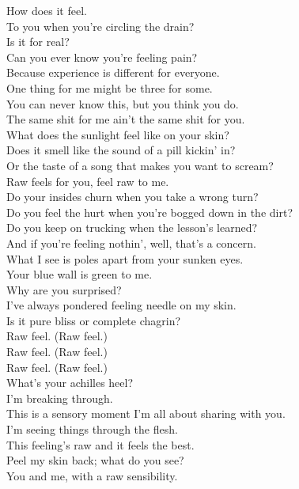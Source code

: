 

How does it feel. \\
To you when you're circling the drain? \\
Is it for real? \\
Can you ever know you're feeling pain? \\
Because experience is different for everyone. \\
One thing for me might be three for some. \\
You can never know this, but you think you do. \\
The same shit for me ain't the same shit for you. \\

What does the sunlight feel like on your skin? \\
Does it smell like the sound of a pill kickin' in? \\
Or the taste of a song that makes you want to scream? \\
Raw feels for you, feel raw to me. \\

Do your insides churn when you take a wrong turn? \\
Do you feel the hurt when you're bogged down in the dirt? \\
Do you keep on trucking when the lesson's learned? \\
And if you're feeling nothin', well, that's a concern. \\

What I see is poles apart from your sunken eyes. \\
Your blue wall is green to me. \\
Why are you surprised? \\
I've always pondered feeling needle on my skin. \\
Is it pure bliss or complete chagrin? \\

Raw feel. (Raw feel.) \\
Raw feel. (Raw feel.) \\
Raw feel. (Raw feel.) \\
What's your achilles heel? \\

I'm breaking through. \\
This is a sensory moment I'm all about sharing with you. \\
I'm seeing things through the flesh. \\
This feeling's raw and it feels the best. \\
Peel my skin back; what do you see? \\
You and me, with a raw sensibility. \\

